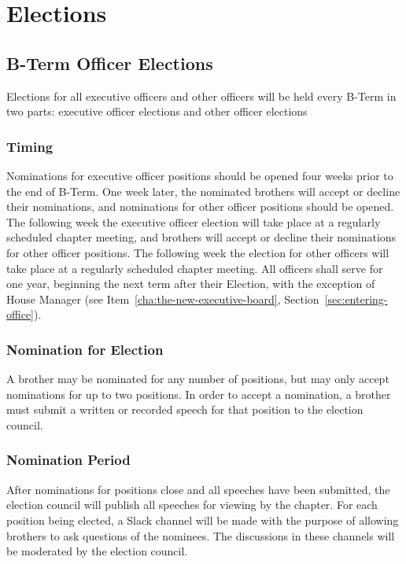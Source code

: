 \chapter{Elections}
\label{cha:elections}

\section{B-Term Officer Elections}
\label{sec:b-term-officer-elections}

Elections for all executive officers and other officers will be held every
B-Term in two parts: executive officer elections and other officer elections

\subsection{Timing}
\label{sec:timing}

Nominations for executive officer positions should be opened four weeks prior to
the end of B-Term.
One week later, the nominated brothers will accept or decline
their nominations, and nominations for other officer positions should be opened.
The following week the executive officer election will take place at a regularly
scheduled chapter meeting, and brothers will accept or decline their nominations
for other officer positions.
The following week the election for other officers will take place at a
regularly scheduled chapter meeting.
All officers shall serve for one year, beginning the next term after their
Election, with the exception of House Manager (see
Item~\ref{cha:the-new-executive-board}, Section~\ref{sec:entering-office}).

\subsection{Nomination for Election}
\label{sec:nomination-for-election}

A brother may be nominated for any number of positions, but may only accept
nominations for up to two positions.
In order to accept a nomination, a brother must submit a written or recorded
speech for that position to the election council.

\subsection{Nomination Period}
\label{nomination-period}

After nominations for positions close and all speeches have been submitted, the
election council will publish all speeches for viewing by the chapter.
For each position being elected, a Slack channel will be made with the purpose
of allowing brothers to ask questions of the nominees.
The discussions in these channels will be moderated by the election council.

